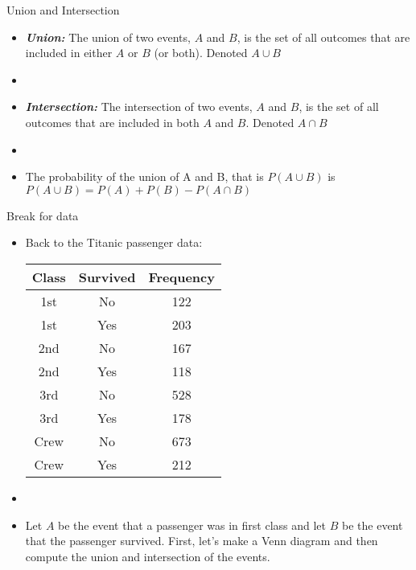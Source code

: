 \documentclass[xcolor=dvipsnames]{beamer}
\begin{document}
\begin{frame}{Union and Intersection}
	\begin{itemize}
		\item \textbf{\emph{Union:}} The union of two events, $A$ and $B$, is the set of all outcomes that are included in either $A$ or $B$ (or both). Denoted $A \cup B$
		\item[]
		\item \textbf{\emph{Intersection:}} The intersection of two events, $A$ and $B$, is the set of all outcomes that are included in both $A$ and $B$. Denoted $A \cap B$
		\item[]
		\item The probability of the union of A and B, that is $P(A\cup B)$ is $P(A \cup B) = P(A) + P(B) - P(A\cap B)$
	\end{itemize}
\end{frame}

\begin{frame}{Break for data}
\begin{itemize}
	\item Back to the Titanic passenger data:
	\begin{center}
		\begin{tabular}{|c|c|c|} \hline
			\textbf{Class} & \textbf{Survived} & \textbf{Frequency} \\ \hline \hline
			1st  & No       &        122 \\ \hline 
			1st   &Yes       &       203\\ \hline 
			2nd   &No         &      167\\ \hline 
			2nd   &Yes         &     118\\ \hline 
			3rd   &No           &    528\\ \hline 
			3rd   &Yes           &   178\\ \hline 
			Crew  &No             &  673\\ \hline 
			Crew  &Yes             & 212\\ \hline 
		\end{tabular}
	\end{center}
	\item[]
	\item Let $A$ be the event that a passenger was in first class and let $B$ be the event that the passenger survived. First, let's make a Venn diagram and then compute the union and intersection of the events.
\end{itemize}
\end{frame}
\end{document}
